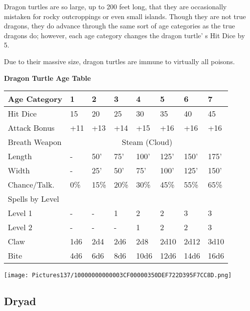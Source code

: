 \documentclass[a4paper,twoside,openany,10pt]{book}
\begin{document}
\begin{multicols}{2}
Dragon turtles are so large, up to 200 feet long, that they are occasionally mistaken for rocky outcroppings or even small islands. Though they are not true dragons, they do advance through the same sort of age categories as the true dragons do; however, each age category changes the dragon turtle' s Hit Dice by 5.

Due to their massive size, dragon turtles are immune to virtually all poisons.


\begin{center}
\textbf{Dragon Turtle Age Table}\\

\begin{tabularx}{0.47\textwidth}{@{}lXXXXXXX@{}}
Age Category & 1 & 2 & 3 & 4 & 5 & 6 & 7 \\\hline
Hit Dice & 15 & 20 & 25 & 30 & 35 & 40 & 45 \\\hline
Attack Bonus & +11 & +13 & +14 & +15 & +16 & +16 & +16 \\\hline
Breath Weapon & \multicolumn{7}{c}{Steam (Cloud)}\\\hline
Length & - & 50' & 75' & 100' & 125' & 150' & 175' \\\hline
Width & - & 25' & 50' & 75' & 100' & 125' & 150' \\\hline 
Chance/Talk. & 0\% & 15\% & 20\% & 30\% & 45\% & 55\% & 65\% \\\hline
Spells by Level & & & & & & & \\\hline
Level 1 & - & - & 1 & 2 & 2 & 3 & 3 \\\hline
Level 2 & - & - & - & 1 & 2 & 2 & 3 \\\hline
Claw & 1d6 & 2d4 & 2d6 & 2d8 & 2d10 & 2d12 & 3d10 \\\hline
Bite & 4d6 & 6d6 & 8d6 & 10d6 & 12d6 & 14d6 & 16d6 \\\hline
\end{tabularx}
\end{center}


\begin{center}
	\texttt{[image: Pictures137/10000000000003CF00000350DEF722D395F7CC8D.png]}	
\end{center}

\columnbreak

\subsection*{Dryad}\label{dryad}


\end{multicols}
\end{document}
